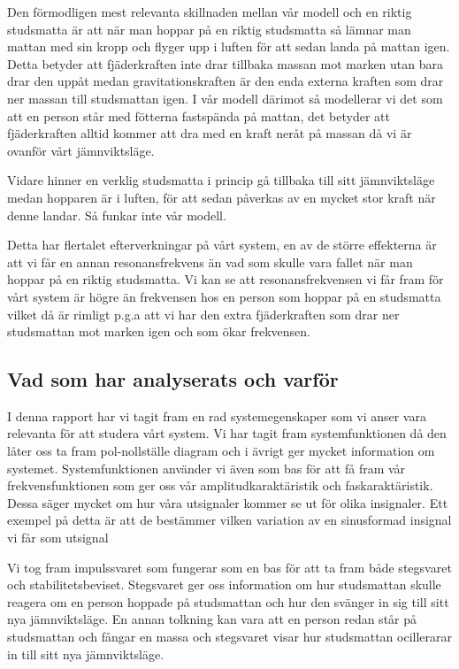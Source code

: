 \documentclass[10pt,a4paper]{article}
\begin{document}
Den förmodligen mest relevanta skillnaden mellan vår modell och en riktig studsmatta är att när man hoppar på en riktig studsmatta så lämnar man mattan med sin kropp och flyger upp i luften för att sedan landa på mattan igen. Detta betyder att fjäderkraften inte drar tillbaka massan mot marken utan bara drar den uppåt medan gravitationskraften är den enda externa kraften som drar ner massan till studsmattan igen. I vår modell därimot så modellerar vi det som att en person står med fötterna fastspända på mattan, det betyder att fjäderkraften alltid kommer att dra med en kraft neråt på massan då vi är ovanför vårt jämnviktsläge.

Vidare hinner en verklig studsmatta i princip gå tillbaka till sitt jämnviktsläge medan hopparen är i luften, för att sedan påverkas av en mycket stor kraft när denne landar. Så funkar inte vår modell.

Detta har flertalet efterverkningar på vårt system, en av de större effekterna är att vi får en annan resonansfrekvens än vad som skulle vara fallet när man hoppar på en riktig studsmatta. Vi kan se att resonansfrekvensen vi får fram för vårt system är högre än frekvensen hos en person som hoppar på en studsmatta vilket då är rimligt p.g.a att vi har den extra fjäderkraften som drar ner studsmattan mot marken igen och som ökar frekvensen.

\subsection{Vad som har analyserats och varför}

I denna rapport har vi tagit fram en rad systemegenskaper som vi anser vara relevanta för att studera vårt system. Vi har tagit fram systemfunktionen då den låter oss ta fram pol-nollställe diagram och i ävrigt ger mycket information om systemet. Systemfunktionen använder vi även som bas för att få fram vår frekvensfunktionen som ger oss vår  amplitudkaraktäristik och faskaraktäristik. Dessa säger mycket om hur våra utsignaler kommer se ut för olika insignaler. Ett exempel på detta är att de bestämmer vilken variation av en sinusformad insignal vi får som utsignal

Vi tog fram impulssvaret som fungerar som en bas för att ta fram både stegsvaret och stabilitetsbeviset. Stegsvaret ger oss information om hur studsmattan skulle reagera om en person hoppade på studsmattan och hur den svänger in sig till sitt nya jämnviktsläge. En annan tolkning kan vara att en person redan står på studsmattan och fångar en massa och stegsvaret visar hur studsmattan ocillerarar in till sitt nya jämnviktsläge.
\end{document}
